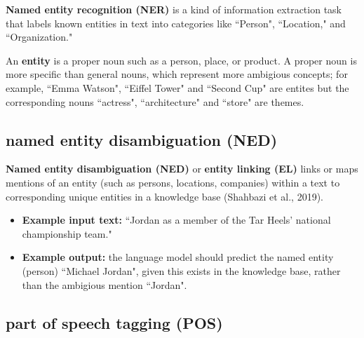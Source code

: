 \textbf{Named entity recognition (NER)} is a kind of information extraction task that labels known entities in text into categories like ``Person", ``Location," and ``Organization." \newline 

An \textbf{entity} is a proper noun such as a person, place, or product. A proper noun is more specific than general nouns, which represent more ambigious concepts; for example, ``Emma Watson", ``Eiffel Tower" and ``Second Cup" are entites but the corresponding nouns ``actress", ``architecture" and ``store" are themes.



\subsection{named entity disambiguation (NED)} \label{nlptask:namedentitydisambiguationNED}

\textbf{Named entity disambiguation (NED)} or \textbf{entity linking (EL)} links or maps mentions of an entity (such as persons, locations, companies) within a text to corresponding unique entities in a knowledge base (Shahbazi et al., 2019). 

\begin{itemize}
    \item \textbf{Example input text: } ``Jordan as a  member of the Tar Heels' national championship team."
    
    \item \textbf{Example output: } the language model should predict the named entity (person) ``Michael Jordan", given this exists in the knowledge base, rather than the ambigious mention ``Jordan". 
\end{itemize}





\subsection{part of speech tagging (POS)} \label{nlptask:postagging}

